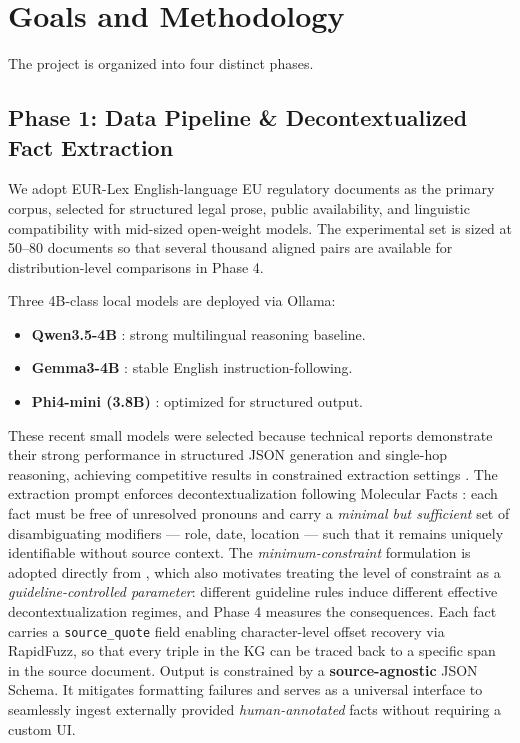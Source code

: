 \documentclass[11pt]{article}
\begin{document}
\section{Goals and Methodology}

The project is organized into four distinct phases.

\subsection*{Phase 1: Data Pipeline \& Decontextualized Fact Extraction}

We adopt EUR-Lex English-language EU regulatory documents as the primary
corpus, selected for structured legal prose, public availability, and
linguistic compatibility with mid-sized open-weight models.
The experimental set is sized at 50--80 documents so that several thousand 
aligned pairs are available for distribution-level comparisons in Phase 4.

Three 4B-class local models are deployed via Ollama:
\begin{itemize}[leftmargin=1.5em, itemsep=2pt]
    \item \textbf{Qwen3.5-4B} \cite{qwen2026}: strong multilingual reasoning baseline.
    \item \textbf{Gemma3-4B} \cite{gemma2026}: stable English instruction-following.
    \item \textbf{Phi4-mini (3.8B)} \cite{phi2026}: optimized for structured output.
\end{itemize}

These recent small models were selected because technical reports 
demonstrate their strong performance in structured JSON generation and single-hop reasoning, 
achieving competitive results in constrained extraction settings \cite{qwen2026, phi2026}.
The extraction prompt enforces decontextualization following Molecular Facts \cite{gunjal2024molecular}: each fact must be free of unresolved pronouns and carry a \textit{minimal but sufficient} set of disambiguating modifiers --- role, date, location --- such that it remains uniquely identifiable without source context.
The \textit{minimum-constraint} formulation is adopted directly from \cite{gunjal2024molecular},
which also motivates treating the level of constraint as a
\textit{guideline-controlled parameter}: different guideline rules induce different
effective decontextualization regimes, and Phase 4 measures the consequences.
Each fact carries a \texttt{source\_quote} field enabling character-level offset recovery via RapidFuzz, so that every triple in the KG can be traced
back to a specific span in the source document.
Output is constrained by a \textbf{source-agnostic} JSON Schema. It mitigates formatting failures and serves as a universal interface to seamlessly ingest externally provided \textit{human-annotated} facts without requiring a custom UI.
\end{document}
